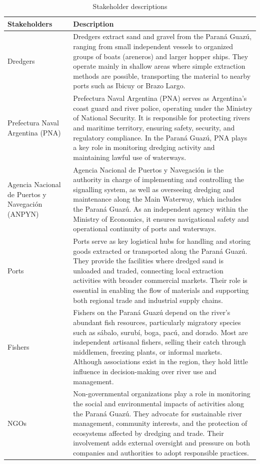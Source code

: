 \begin{table}[H]
\caption{Stakeholder descriptions}
\centering
\begin{tabularx}{\linewidth}{p{3.5cm}X} %
\toprule
Stakeholders & Description \\
\midrule
Dredgers & Dredgers extract sand and gravel from the Paraná Guazú, ranging from small independent vessels to organized groups of boats (areneros) and larger hopper ships. They operate mainly in shallow areas where simple extraction methods are possible, transporting the material to nearby ports such as Ibicuy or Brazo Largo. \\
\midrule
Prefectura Naval Argentina (PNA) & Prefectura Naval Argentina (PNA) serves as Argentina’s coast guard and river police, operating under the Ministry of National Security. It is responsible for protecting rivers and maritime territory, ensuring safety, security, and regulatory compliance. In the Paraná Guazú, PNA plays a key role in monitoring dredging activity and maintaining lawful use of waterways. \\
\midrule
Agencia Nacional de Puertos y Navegación (ANPYN) & Agencia Nacional de Puertos y Navegación is the authority in charge of implementing and controlling the signalling system, as well as overseeing dredging and maintenance along the Main Waterway, which includes the Paraná Guazú. As an independent agency within the Ministry of Economics, it ensures navigational safety and operational continuity of ports and waterways. \\
\midrule
Ports & Ports serve as key logistical hubs for handling and storing goods extracted or transported along the Paraná Guazú. They provide the facilities where dredged sand is unloaded and traded, connecting local extraction activities with broader commercial markets. Their role is essential in enabling the flow of materials and supporting both regional trade and industrial supply chains. \\
\midrule
Fishers & Fishers on the Paraná Guazú depend on the river’s abundant fish resources, particularly migratory species such as sábalo, surubí, boga, pacú, and dorado. Most are independent artisanal fishers, selling their catch through middlemen, freezing plants, or informal markets. Although associations exist in the region, they hold little influence in decision-making over river use and management. \\
\midrule
NGOs & Non-governmental organizations play a role in monitoring the social and environmental impacts of activities along the Paraná Guazú. They advocate for sustainable river management, community interests, and the protection of ecosystems affected by dredging and trade. Their involvement adds external oversight and pressure on both companies and authorities to adopt responsible practices. \\

\end{tabularx}
\end{table}
